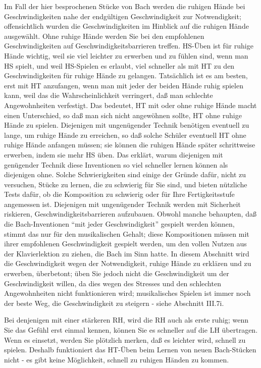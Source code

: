 Im Fall der hier besprochenen Stücke von Bach werden die ruhigen Hände bei Geschwindigkeiten nahe der endgültigen Geschwindigkeit zur Notwendigkeit; offensichtlich wurden die Geschwindigkeiten im Hinblick auf die ruhigen Hände ausgewählt.
Ohne ruhige Hände werden Sie bei den empfohlenen Geschwindigkeiten auf Geschwindigkeitsbarrieren treffen.
HS-Üben ist für ruhige Hände wichtig, weil sie viel leichter zu erwerben und zu fühlen sind, wenn man HS spielt, und weil HS-Spielen es erlaubt, viel schneller als mit HT zu den Geschwindigkeiten für ruhige Hände zu gelangen.
Tatsächlich ist es am besten, erst mit HT anzufangen, wenn man mit jeder der beiden Hände ruhig spielen kann, weil das die Wahrscheinlichkeit verringert, daß man schlechte Angewohnheiten verfestigt.
Das bedeutet, HT mit oder ohne ruhige Hände macht einen Unterschied, so daß man sich nicht angewöhnen sollte, HT ohne ruhige Hände zu spielen.
Diejenigen mit ungenügender Technik benötigen eventuell zu lange, um ruhige Hände zu erreichen, so daß solche Schüler eventuell HT ohne ruhige Hände anfangen müssen; sie können die ruhigen Hände später schrittweise erwerben, indem sie mehr HS üben.
Das erklärt, warum diejenigen mit genügender Technik diese Inventionen so viel schneller lernen können als diejenigen ohne.
Solche Schwierigkeiten sind einige der Gründe dafür, nicht zu versuchen, Stücke zu lernen, die zu schwierig für Sie sind, und bieten nützliche Tests dafür, ob die Komposition zu schwierig oder für Ihre Fertigkeitsstufe angemessen ist.
Diejenigen mit ungenügender Technik werden mit Sicherheit riskieren, Geschwindigkeitsbarrieren aufzubauen.
Obwohl manche behaupten, daß die Bach-Inventionen \enquote{mit jeder Geschwindigkeit} gespielt werden können, stimmt das nur für den musikalischen Gehalt; diese Kompositionen müssen mit ihrer empfohlenen Geschwindigkeit gespielt werden, um den vollen Nutzen aus der Klavierlektion zu ziehen, die Bach im Sinn hatte.
In diesem Abschnitt wird die Geschwindigkeit wegen der Notwendigkeit, ruhige Hände zu erklären und zu erwerben, überbetont;
üben Sie jedoch nicht die Geschwindigkeit um der Geschwindigkeit willen, da dies wegen des Stresses und den schlechten Angewohnheiten nicht funktionieren wird; musikalisches Spielen ist immer noch der beste Weg, die Geschwindigkeit zu steigern - siehe Abschnitt III.7i.

Bei denjenigen mit einer stärkeren RH, wird die RH auch als erste ruhig; wenn Sie das Gefühl erst einmal kennen, können Sie es schneller auf die LH übertragen.
Wenn es einsetzt, werden Sie plötzlich merken, daß es leichter wird, schnell zu spielen.
Deshalb funktioniert das HT-Üben beim Lernen von neuen Bach-Stücken nicht - es gibt keine Möglichkeit, schnell zu ruhigen Händen zu kommen.


